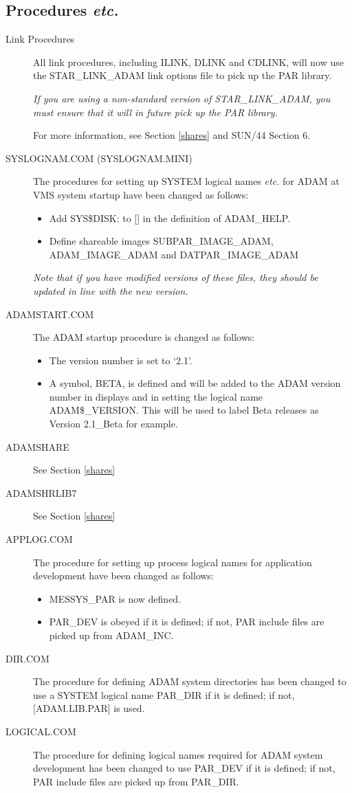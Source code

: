 \subsection{Procedures {\em etc.}}
\label{procs}
\begin{description}
\item[Link Procedures] All link procedures, including ILINK, DLINK and CDLINK,
will now use the STAR\_LINK\_ADAM link options file to pick up the PAR library.

{\em If you are using a non-standard version of STAR\_LINK\_ADAM, you must
ensure that it will in future pick up the PAR library.}

For more information, see Section \ref{shares} and SUN/44 Section 6.
\item[SYSLOGNAM.COM (SYSLOGNAM.MINI)] The procedures for setting up SYSTEM
logical names {\em etc.} for ADAM at VMS system startup have been changed as
follows:
\begin{itemize}
\item Add SYS\$DISK: to [] in the definition of ADAM\_HELP.
\item Define shareable images SUBPAR\_IMAGE\_ADAM, ADAM\_IMAGE\_ADAM and
DATPAR\_IMAGE\_ADAM
\end{itemize}
{\em Note that if you have modified versions of these files, they should be
updated in line with the new version.}
\item[ADAMSTART.COM] The ADAM startup procedure is changed as follows:
\begin{itemize}
\item The version number is set to `2.1'.
\item A symbol, BETA, is defined and will be added to the ADAM version number
in displays and in setting the logical name ADAM\$\_VERSION.
This will be used to label Beta releases as Version 2.1\_Beta for example.
\end{itemize}

\item[ADAMSHARE] See Section \ref{shares}
\item[ADAMSHRLIB7] See Section \ref{shares}
\item[APPLOG.COM]
The procedure  for setting up process logical names for application
development have been changed as follows:
\begin{itemize}
\item MESSYS\_PAR is now defined.
\item PAR\_DEV is obeyed if it is defined; if not, PAR include files are
picked up from ADAM\_INC.
\end{itemize}
\item[DIR.COM] The procedure for defining ADAM system directories has been
changed to use a SYSTEM logical name PAR\_DIR if it is defined; if not,
[ADAM.LIB.PAR] is used.
\item[LOGICAL.COM] The procedure for defining logical names required for
ADAM system development has been changed to use PAR\_DEV if it is defined;
if not, PAR include files are picked up from PAR\_DIR.
\end{description}



